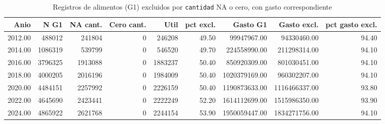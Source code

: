 \begin{table}[ht]
\centering
\caption{Registros de alimentos (G1) excluidos por \texttt{cantidad} NA o cero, con gasto correspondiente} 
\label{tab:18_G1_cantidad_NA_gasto}
\begin{tabular}{rrrrrrrrr}
  \toprule
Anio & N G1 & NA cant. & Cero cant. & Util & pct excl. & Gasto G1 & Gasto excl. & pct gasto excl. \\ 
  \midrule
2012.00 & 488012 & 241804 &   0 & 246208 & 49.50 & 99947967.00 & 94330460.00 & 94.40 \\ 
  2014.00 & 1086319 & 539799 &   0 & 546520 & 49.70 & 224558990.00 & 211298314.00 & 94.10 \\ 
  2016.00 & 3796325 & 1913088 &   0 & 1883237 & 50.40 & 850920309.00 & 801030451.00 & 94.10 \\ 
  2018.00 & 4000205 & 2016196 &   0 & 1984009 & 50.40 & 1020379169.00 & 960302207.00 & 94.10 \\ 
  2020.00 & 4484151 & 2257992 &   0 & 2226159 & 50.40 & 1190873633.00 & 1116466337.00 & 93.80 \\ 
  2022.00 & 4645690 & 2423441 &   0 & 2222249 & 52.20 & 1614112699.00 & 1515986350.00 & 93.90 \\ 
  2024.00 & 4865922 & 2621768 &   0 & 2244154 & 53.90 & 1950059447.00 & 1834271756.00 & 94.10 \\ 
   \bottomrule
\end{tabular}
\end{table}
